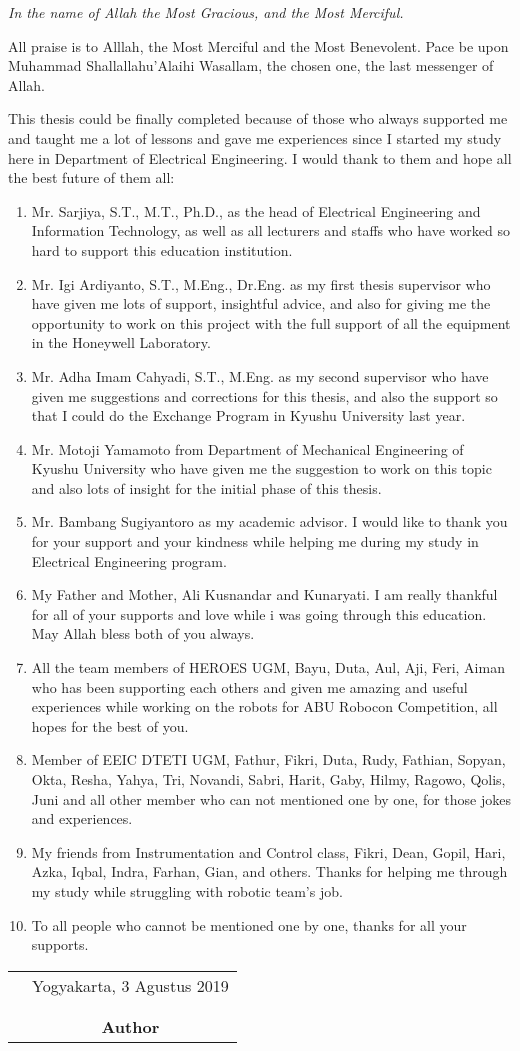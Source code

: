 \documentclass[../thesis.tex]{subfiles}
\begin{document}
\emph{In the name of Allah the Most Gracious, and the Most Merciful.}
\vspace{0.5cm}

All praise is to Alllah, the Most Merciful and the Most Benevolent. Pace be upon Muhammad Shallallahu'Alaihi Wasallam, the chosen one, the last messenger of Allah.

This thesis could be finally completed because of those who always supported me and taught me a lot of lessons and gave me experiences since I started my study here in Department of Electrical Engineering. 
I would thank to them and hope all the best future of them all:

\begin{enumerate}
\item{Mr. Sarjiya, S.T., M.T., Ph.D., as the head of Electrical Engineering and Information Technology, as well as all lecturers and staffs who have worked so hard to support this education institution.}
\item{Mr. Igi Ardiyanto, S.T., M.Eng., Dr.Eng. as my first thesis supervisor who have given me lots of support, insightful advice, and also for giving me the opportunity to work on this project with the full support of all the equipment in the Honeywell Laboratory.}
\item{Mr. Adha Imam Cahyadi, S.T., M.Eng. as my second supervisor who have given me suggestions and corrections for this thesis, and also the support so that I could do the Exchange Program in Kyushu University last year.}
\item{Mr. Motoji Yamamoto from Department of Mechanical Engineering of Kyushu University who have given me the suggestion to work on this topic and also lots of insight for the initial phase of this thesis.}
\item{Mr. Bambang Sugiyantoro as my academic advisor. I would like to thank you for your support and your kindness while helping me during my study in Electrical Engineering program.}
\item{My Father and Mother, Ali Kusnandar and Kunaryati. I am really thankful for all of your supports and love while i was going through this education. May Allah bless both of you always.}
\item{All the team members of HEROES UGM, Bayu, Duta, Aul, Aji, Feri, Aiman who has been supporting each others and given me amazing and useful experiences while working on the robots for ABU Robocon Competition, all hopes for the best of you.}
\item{Member of EEIC DTETI UGM, Fathur, Fikri, Duta, Rudy, Fathian, Sopyan, Okta, Resha, Yahya, Tri, Novandi, Sabri, Harit, Gaby, Hilmy, Ragowo, Qolis, Juni and all other member who can not mentioned one by one, for those jokes and experiences.}
\item{My friends from Instrumentation and Control class, Fikri, Dean, Gopil, Hari, Azka, Iqbal, Indra, Farhan, Gian, and others. Thanks for helping me through my study while struggling with robotic team's job.}
\item{To all people who cannot be mentioned one by one, thanks for all your supports.}
\end{enumerate}

\vspace{0.5cm}

\begin{tabular}{p{7.5cm}c}
&Yogyakarta, 3 Agustus 2019\\
&\\
&\\
&\textbf{Author}
\end{tabular}
\end{document}
